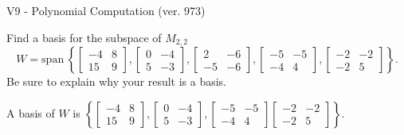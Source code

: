 \begin{exercise}
  \begin{exerciseTitle}V9 - Polynomial Computation (ver. 973)\end{exerciseTitle}
  \begin{exerciseStatement}
    Find a basis for the subspace of \(M_{2,2}\) 
\[W=\mathrm{span}\ \left\{\left[\begin{array}{cc}
-4 & 8 \\
15 & 9
\end{array}\right] , \left[\begin{array}{cc}
0 & -4 \\
5 & -3
\end{array}\right] , \left[\begin{array}{cc}
2 & -6 \\
-5 & -6
\end{array}\right] , \left[\begin{array}{cc}
-5 & -5 \\
-4 & 4
\end{array}\right] , \left[\begin{array}{cc}
-2 & -2 \\
-2 & 5
\end{array}\right]\right\}.\]
 Be sure to explain why your result is a basis.


  \end{exerciseStatement}
  \begin{exerciseAnswer}
   A basis of \(W\) is  \(\left\{\left[\begin{array}{cc}
-4 & 8 \\
15 & 9
\end{array}\right] , \left[\begin{array}{cc}
0 & -4 \\
5 & -3
\end{array}\right] , \left[\begin{array}{cc}
-5 & -5 \\
-4 & 4
\end{array}\right] \left[\begin{array}{cc}
-2 & -2 \\
-2 & 5
\end{array}\right]\right\}\).
  


  \end{exerciseAnswer}
\end{exercise}